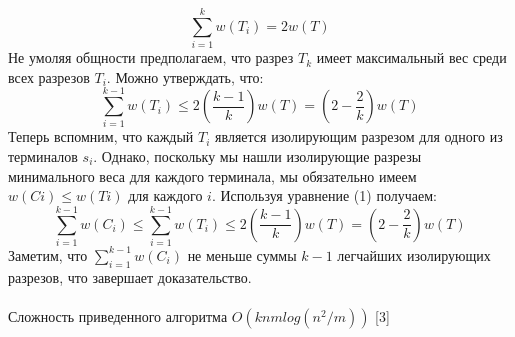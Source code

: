\[\sum_{i=1}^{k}w(T_i) = 2w(T) \tag{1}\] 
Не умоляя общности предполагаем, что разрез \(T_k\) имеет максимальный вес среди всех разрезов \(T_i\). Можно утверждать, что:
\[\sum_{i=1}^{k-1}w(T_i) \leq{2(\frac{k-1}{k})w(T)} = (2-\frac{2}{k})w(T) \tag{2}\] 
Теперь вспомним, что каждый \(T_i\) является изолирующим разрезом для одного из терминалов \(s_i\). 
Однако, поскольку мы нашли изолирующие разрезы минимального веса для каждого терминала, мы обязательно имеем \(w(Ci) \leq{w(Ti)}\) для каждого \(i\). Используя уравнение (1) получаем:
\[\sum_{i=1}^{k-1}w(C_i)\leq{\sum_{i=1}^{k-1}w(T_i) \leq{2(\frac{k-1}{k})w(T)}} = (2-\frac{2}{k})w(T) \tag{3}\] 
Заметим, что \(\sum_{i=1}^{k-1}w(C_i)\) не меньше суммы \(k-1\) легчайших изолирующих разрезов, что завершает доказательство.
\\\\Сложность приведенного алгоритма \(O(knmlog(n^2/m))\) [3]